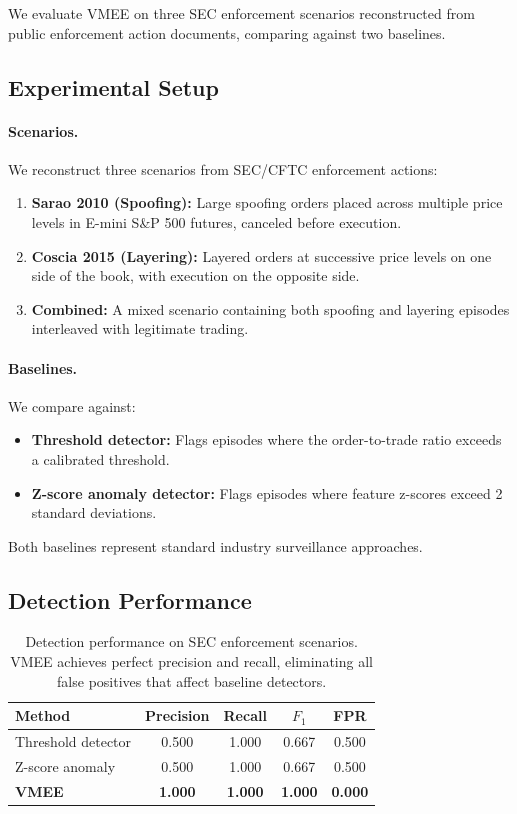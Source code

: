 \documentclass[11pt]{article}
\begin{document}
We evaluate VMEE on three SEC enforcement scenarios reconstructed from public enforcement action documents, comparing against two baselines.

\subsection{Experimental Setup}

\paragraph{Scenarios.}
We reconstruct three scenarios from SEC/CFTC enforcement actions:
\begin{enumerate}[nosep]
  \item \textbf{Sarao 2010 (Spoofing):} Large spoofing orders placed across multiple price levels in E-mini S\&P 500 futures, canceled before execution.
  \item \textbf{Coscia 2015 (Layering):} Layered orders at successive price levels on one side of the book, with execution on the opposite side.
  \item \textbf{Combined:} A mixed scenario containing both spoofing and layering episodes interleaved with legitimate trading.
\end{enumerate}

\paragraph{Baselines.}
We compare against:
\begin{itemize}[nosep]
  \item \textbf{Threshold detector:} Flags episodes where the order-to-trade ratio exceeds a calibrated threshold.
  \item \textbf{Z-score anomaly detector:} Flags episodes where feature z-scores exceed 2 standard deviations.
\end{itemize}
Both baselines represent standard industry surveillance approaches.

\subsection{Detection Performance}

\begin{table}[t]
\centering
\begin{tabular}{@{}lcccc@{}}
\toprule
\textbf{Method} & \textbf{Precision} & \textbf{Recall} & \textbf{$F_1$} & \textbf{FPR} \\
\midrule
Threshold detector    & 0.500 & 1.000 & 0.667 & 0.500 \\
Z-score anomaly       & 0.500 & 1.000 & 0.667 & 0.500 \\
\midrule
\textbf{VMEE}         & \textbf{1.000} & \textbf{1.000} & \textbf{1.000} & \textbf{0.000} \\
\bottomrule
\end{tabular}
\caption{Detection performance on SEC enforcement scenarios. VMEE achieves perfect precision and recall, eliminating all false positives that affect baseline detectors.}
\label{tab:detection}
\end{table}
\end{document}
